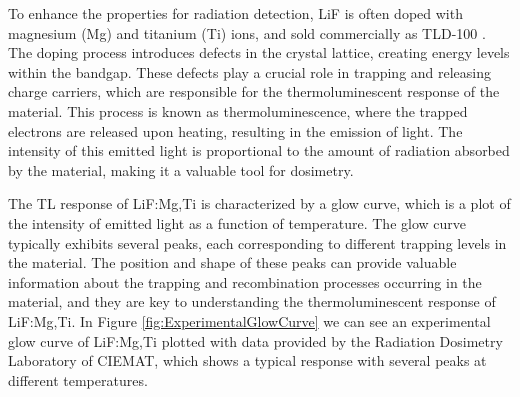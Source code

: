 \vspace{10pt}

To enhance the properties for radiation detection, LiF is often doped with magnesium (Mg) and titanium (Ti) ions, and sold commercially as TLD-100 \cite{horowitz_thermoluminescence_2007}. The doping process introduces defects in the crystal lattice, creating energy levels within the bandgap. These defects play a crucial role in trapping and releasing charge carriers, which are responsible for the thermoluminescent response of the material. This process is known as thermoluminescence, where the trapped electrons are released upon heating, resulting in the emission of light. The intensity of this emitted light is proportional to the amount of radiation absorbed by the material, making it a valuable tool for dosimetry.

\vspace{10pt}

The TL response of LiF:Mg,Ti is characterized by a glow curve, which is a plot of the intensity of emitted light as a function of temperature. The glow curve typically exhibits several peaks, each corresponding to different trapping levels in the material. The position and shape of these peaks can provide valuable information about the trapping and recombination processes occurring in the material, and they are key to understanding the thermoluminescent response of LiF:Mg,Ti. In Figure \ref{fig:ExperimentalGlowCurve} we can see an experimental glow curve of LiF:Mg,Ti plotted with data provided by the Radiation Dosimetry Laboratory of CIEMAT, which shows a typical response with several peaks at different temperatures. 

